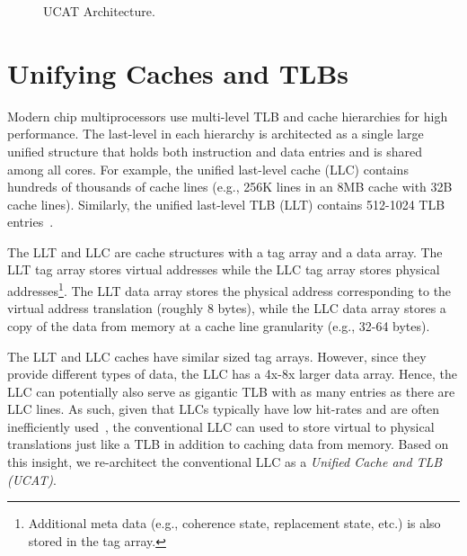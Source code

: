 \begin{figure*}[tbh] 
\vspace{-0. in}
\centering
\centerline{}
\caption{\small UCAT Architecture. \normalsize}
\label{fig:UCAT} 
\vspace{-0.0in}
\end{figure*}

\section{Unifying Caches and TLBs}
\label{sec:UCAT}

\noindent Modern chip multiprocessors use multi-level TLB and cache
hierarchies for high performance. The last-level in each hierarchy is
architected as a single large unified structure that holds both
instruction and data entries and is shared among all cores. For
example, the unified last-level cache (LLC) contains hundreds of
thousands of cache lines (e.g., 256K lines in an 8MB cache with 32B
cache lines). Similarly, the unified last-level TLB (LLT) contains
512-1024 TLB entries~\cite{sodani2016knights,ia_manual}.


The LLT and LLC are cache structures with a tag array and a data
array. The LLT tag array stores virtual addresses while the LLC tag
array stores physical addresses\footnote{Additional meta data (e.g.,
coherence state, replacement state, etc.) is also stored in the tag
array.}. The LLT data array stores the physical address corresponding
to the virtual address translation (roughly 8 bytes), while the LLC
data array stores a copy of the data from memory at a cache line
granularity (e.g., 32-64 bytes).



The LLT and LLC caches have similar sized tag arrays. However, since
they provide different types of data, the LLC has a 4x-8x larger data
array. Hence, the LLC can potentially also serve as gigantic TLB with
as many entries as there are LLC lines. As such, given that LLCs
typically have low hit-rates and are often inefficiently
used~\cite{jaleel_rrip,setdueling,wu2011,jimenez_micro2013,khan2010},
the conventional LLC can used to store virtual to physical
translations just like a TLB in addition to caching data from memory.
Based on this insight, we re-architect the conventional LLC as a {\em
Unified Cache and TLB (UCAT)}.

